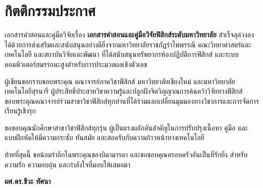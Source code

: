 \chapter*{กิตติกรรมประกาศ}

เอกสารคำสอนและคู่มือวิจัยเรื่อง \textbf{เอกสารคำสอนและคู่มือวิจัยฟิสิกส์ระดับมหาวิทยาลัย} สำเร็จลุล่วงลงได้ด้วยการส่งเสริมและสนับสนุนอย่างดียิ่งจากมหาวิทยาลัยราชภัฏรำไพพรรณี คณะวิทยาศาสตร์และเทคโนโลยี และสถาบันวิจัยและพัฒนา ที่ได้สนับสนุนทรัพยากรห้องปฏิบัติการฟิสิกส์ และระบบคอมพิวเตอร์สมรรถนะสูงสำหรับการประมวลผลเชิงตัวเลข

ผู้เขียนขอกราบขอบพระคุณ คณาจารย์ภาควิชาฟิสิกส์ มหาวิทยาลัยเชียงใหม่ และมหาวิทยาลัยเทคโนโลยีสุรนารี ผู้ประสิทธิ์ประสาทวิชาความรู้และปลูกฝังจิตวิญญาณการค้นคว้าวิจัยทางฟิสิกส์ ขอบพระคุณคณาจารย์ร่วมสาขาวิชาฟิสิกส์ทุกท่านที่ได้ร่วมแลกเปลี่ยนมุมมองทางวิชาการและการจัดการเรียนรู้เชิงรุก

ขอขอบคุณนักศึกษาสาขาวิชาฟิสิกส์ทุกรุ่น ผู้เป็นแรงผลักดันสำคัญในการปรับปรุงเนื้อหา คู่มือ และแบบฝึกหัดให้มีความกระชับ ทันสมัย และสอดรับกับความก้าวหน้าทางเทคโนโลยี

ท้ายที่สุดนี้ ขอน้อมรำลึกในพระคุณของบิดามารดา และขอขอบคุณครอบครัวอันเป็นที่รักยิ่ง สำหรับความรัก ความอบอุ่น และกำลังใจที่มอบให้เสมอมา

\vspace{1.5cm}
\begin{flushright}
\textbf{ผศ.ดร.ชีวะ ทัศนา}
\end{flushright}
